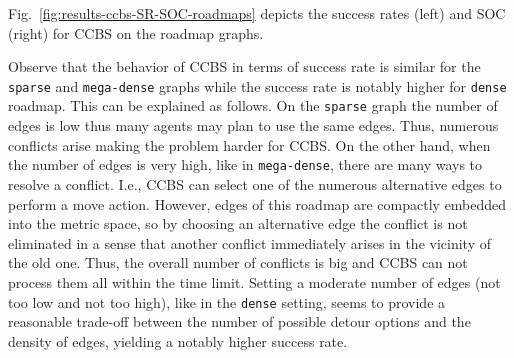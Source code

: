 \documentclass[review]{elsarticle}
\newcommand\konstantin[1]{\nb{\textbf{Konstantin:}}{red}{#1}}
\newcommand\roni[1]{\nb{\textbf{Roni:}}{green}{#1}}
\newcommand{\ccbs}{\ac{CCBS}\xspace}
\begin{document}
Fig.~\ref{fig:results-ccbs-SR-SOC-roadmaps} depicts the success rates (left) and SOC (right) for \ccbs on the roadmap graphs. 

Observe that the behavior of \ccbs in terms of success rate is similar for the \texttt{sparse} and \texttt{mega-dense} graphs while the success rate is notably higher for \texttt{dense} roadmap. This can be explained as follows. On the \texttt{sparse} graph the number of edges is low thus many agents may plan to use the same edges. Thus, numerous conflicts arise making the problem harder for \ccbs. On the other hand, when the number of edges is very high, like in \texttt{mega-dense}, there are many ways to resolve a conflict. I.e., \ccbs can select one of the numerous alternative edges to perform a move action. However, edges of this roadmap are compactly embedded into the metric space, so by choosing an alternative edge the conflict is not eliminated in a sense that another conflict immediately arises in the vicinity of the old one. Thus, the overall number of conflicts is big and \ccbs can not process them all within the time limit. Setting a moderate number of edges (not too low and not too high), like in the \texttt{dense} setting, seems to provide a reasonable trade-off between the number of possible detour options and the density of edges, yielding a notably higher success rate.
\end{document}
